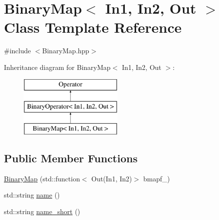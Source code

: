 \hypertarget{class_binary_map}{\section{\-Binary\-Map$<$ \-In1, \-In2, \-Out $>$ \-Class \-Template \-Reference}
\label{class_binary_map}
}


{\ttfamily \#include $<$\-Binary\-Map.\-hpp$>$}

\-Inheritance diagram for \-Binary\-Map$<$ \-In1, \-In2, \-Out $>$\-:\begin{figure}[H]
\begin{center}
\leavevmode
\includegraphics[height=3.000000cm]{class_binary_map}
\end{center}
\end{figure}
\subsection*{\-Public \-Member \-Functions}
\begin{DoxyCompactItemize}
\item 
\hyperlink{class_binary_map_abd8e19230ff0077f3782734313dafffc}{\-Binary\-Map} (std\-::function$<$ \-Out(\-In1, \-In2)$>$ bmapf\-\_\-)
\item 
std\-::string \hyperlink{class_binary_map_a891da29ca1c109f273e6b0448f261783}{name} ()
\item 
std\-::string \hyperlink{class_binary_map_a27f390ff0c80cdd9bc7b6361ed5df8c2}{name\-\_\-short} ()
\end{DoxyCompactItemize}
